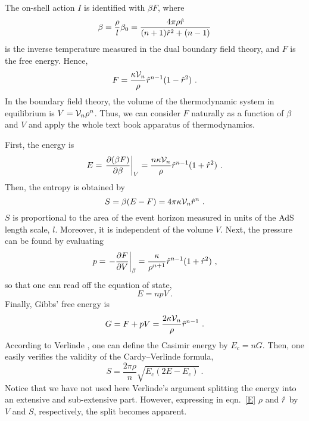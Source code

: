 \documentclass[a4paper,12pt]{article}
\begin{document}
The on-shell action $I$ is identified with $\beta F$, where
\begin{equation}
\label{betadef}
  \beta = \frac{\rho}l \beta_0 =
  \frac{4\pi\rho\hat{r}}{(n+1)\hat{r}^2 +(n-1)}
\end{equation}
is the inverse temperature measured in the dual boundary field
theory, and $F$ is the free energy.
Hence,
\begin{equation}
\label{F}
  F = \frac{\kappa \mathcal{V}_n}{\rho} \hat{r}^{n-1} (1-\hat{r}^2)~.
\end{equation}
In the boundary field theory, the volume of the thermodynamic system
in equilibrium is $V=\mathcal{V}_n \rho^n$. Thus, we can consider $F$
naturally as a function of $\beta$ and $V$ and apply the whole text
book apparatus of thermodynamics.

First, the energy is
\begin{equation}
\label{E}
  E =  \left.\frac{\partial (\beta F)}{\partial \beta}\right|_V =
  \frac{n \kappa \mathcal{V}_n}{\rho} \hat{r}^{n-1} (1+\hat{r}^2)~.
\end{equation}
Then, the entropy is obtained by
\begin{equation}
\label{S}
  S = \beta(E - F) = 4\pi \kappa \mathcal{V}_n \hat{r}^n~.
\end{equation}
$S$ is proportional to the area of the event horizon measured in units
of the AdS length scale, $l$. Moreover, it is independent of the
volume $V$. Next, the pressure can be found by evaluating
\begin{equation}
\label{p}
  p =  \left.-\frac{\partial F}{\partial V}\right|_\beta =
  \frac{\kappa}{\rho^{n+1}} \hat{r}^{n-1} (1+\hat{r}^2)~,
\end{equation}
so that one can read off the equation of state,
\begin{equation}
\label{eqofstate}
  E = npV~.
\end{equation}
Finally, Gibbs' free energy is
\begin{equation}
\label{G}
  G = F + pV = \frac{2 \kappa \mathcal{V}_n}\rho \hat{r}^{n-1}~.
\end{equation}
According to Verlinde \cite{Verlinde00}, one can define the Casimir
energy by $E_c= nG$. Then, one easily verifies the validity of the
Cardy--Verlinde formula,
\begin{equation}
\label{Cardy}
  S = \frac{2\pi\rho}n \sqrt{E_c(2E-E_c)}~.
\end{equation}
Notice that we have not used here Verlinde's argument splitting the
energy into an extensive and sub-extensive part. However, expressing
in eqn.\ \eqref{E} $\rho$ and $\hat{r}$ by $V$ and $S$, respectively, the
split becomes apparent.
\end{document}

